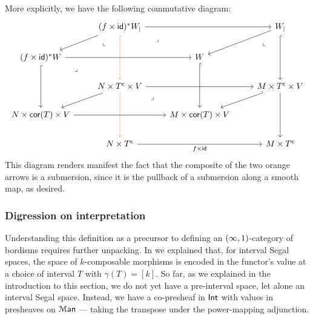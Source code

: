 \begin{remark}
    \nid More explicitly, we have the following commutative diagram:
    \begin{equation}
    \begin{tikzcd}[ampersand replacement=\&]
        \& {(f\times \id)^\ast W_{|}} \&\& {W_{|}} \\
        {(f\times \id)^\ast W} \&\& W \\
        \& {N\times T^{\mathsf{c}}\times V} \&\& {M\times T^{\mathsf{c}}\times V} \\
        {N\times\mathsf{cor}(T)\times V} \&\& {M\times\mathsf{cor}(T)\times V} \\
        \& {N\times T^{\mathsf{c}}} \&\& {M\times T^{\mathsf{c}}}
        \arrow[from=1-2, to=1-4]
        \arrow[from=1-2, to=2-1]
        \arrow[color={rgb,255:red,214;green,153;blue,92}, hook, from=1-2, to=3-2]
        \arrow["\lrcorner"{anchor=center, pos=0.125}, draw=none, from=1-2, to=3-4]
        \arrow["\lrcorner"{anchor=center, pos=0.125, rotate=-90}, draw=none, from=1-2, to=4-1]
        \arrow[from=1-4, to=2-3]
        \arrow[hook, from=1-4, to=3-4]
        \arrow["\lrcorner"{anchor=center, pos=0.125, rotate=-90}, draw=none, from=1-4, to=4-3]
        \arrow[from=2-1, to=2-3]
        \arrow[hook, from=2-1, to=4-1]
        \arrow["\lrcorner"{anchor=center, pos=0.125}, draw=none, from=2-1, to=4-3]
        \arrow[hook, from=2-3, to=4-3]
        \arrow[from=3-2, to=3-4]
        \arrow[from=3-2, to=4-1]
        \arrow[color={rgb,255:red,214;green,153;blue,92}, from=3-2, to=5-2]
        \arrow["\lrcorner"{anchor=center, pos=0.125}, draw=none, from=3-2, to=5-4]
        \arrow[hook', from=3-4, to=4-3]
        \arrow[from=3-4, to=5-4]
        \arrow[from=4-1, to=4-3]
        \arrow["{f\times \id}"', from=5-2, to=5-4]
    \end{tikzcd}
\end{equation}
    This diagram renders manifest the fact that the composite of the two orange arrows is a submersion, since it is the pullback of a submersion along a smooth map, as desired.   
\end{remark}

\subsubsection{Digression on interpretation}

Understanding this definition as a precursor to defining an $(\operatorname{\infty},1)$-category of bordisms requires further unpacking. In  we explained that, for interval Segal spaces, the space of $k$-composable morphisms is encoded in the functor's value at a choice of interval $T$ with $\gamma(T)=[k]$. So far, as we explained in the introduction to this section, we do not yet have a pre-interval space, let alone an interval Segal space. Instead, we have a co-presheaf in $\operatorname{\mathsf{Int}}$ with values in presheaves on $\operatorname{\mathcal M{\sf an}}$ --- taking the transpose under the power-mapping adjunction.


